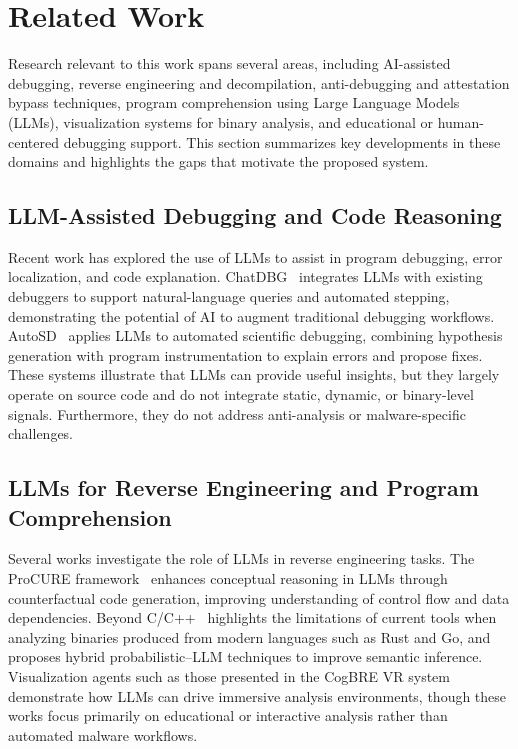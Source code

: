 \documentclass[conference]{IEEEtran}
\begin{document}
\section{Related Work}

Research relevant to this work spans several areas, including AI-assisted debugging, reverse engineering and decompilation, anti-debugging and attestation bypass techniques, program comprehension using Large Language Models (LLMs), visualization systems for binary analysis, and educational or human-centered debugging support. This section summarizes key developments in these domains and highlights the gaps that motivate the proposed system.

\subsection{LLM-Assisted Debugging and Code Reasoning}

Recent work has explored the use of LLMs to assist in program debugging, error localization, and code explanation. ChatDBG~\cite{levin2024chatdbg} integrates LLMs with existing debuggers to support natural-language queries and automated stepping, demonstrating the potential of AI to augment traditional debugging workflows. AutoSD~\cite{kang2023autosd} applies LLMs to automated scientific debugging, combining hypothesis generation with program instrumentation to explain errors and propose fixes. These systems illustrate that LLMs can provide useful insights, but they largely operate on source code and do not integrate static, dynamic, or binary-level signals. Furthermore, they do not address anti-analysis or malware-specific challenges.

\subsection{LLMs for Reverse Engineering and Program Comprehension}

Several works investigate the role of LLMs in reverse engineering tasks. The ProCURE framework~\cite{ren2025procure} enhances conceptual reasoning in LLMs through counterfactual code generation, improving understanding of control flow and data dependencies. Beyond C/C++~\cite{zhang2025beyondccpp} highlights the limitations of current tools when analyzing binaries produced from modern languages such as Rust and Go, and proposes hybrid probabilistic–LLM techniques to improve semantic inference. Visualization agents such as those presented in the CogBRE VR system~\cite{brown2025llmvisre} demonstrate how LLMs can drive immersive analysis environments, though these works focus primarily on educational or interactive analysis rather than automated malware workflows.
\end{document}
